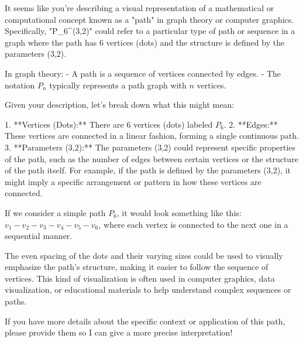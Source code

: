 It seems like you're describing a visual representation of a mathematical or computational concept known as a "path" in graph theory or computer graphics. Specifically, "P_6^(3,2)" could refer to a particular type of path or sequence in a graph where the path has 6 vertices (dots) and the structure is defined by the parameters (3,2).

In graph theory:
- A path is a sequence of vertices connected by edges.
- The notation \(P_n\) typically represents a path graph with \(n\) vertices.

Given your description, let's break down what this might mean:

1. **Vertices (Dots):** There are 6 vertices (dots) labeled \(P_6\).
2. **Edges:** These vertices are connected in a linear fashion, forming a single continuous path.
3. **Parameters (3,2):** The parameters (3,2) could represent specific properties of the path, such as the number of edges between certain vertices or the structure of the path itself. For example, if the path is defined by the parameters (3,2), it might imply a specific arrangement or pattern in how these vertices are connected.

If we consider a simple path \(P_6\), it would look something like this: \(v_1 - v_2 - v_3 - v_4 - v_5 - v_6\), where each vertex is connected to the next one in a sequential manner.

The even spacing of the dots and their varying sizes could be used to visually emphasize the path's structure, making it easier to follow the sequence of vertices. This kind of visualization is often used in computer graphics, data visualization, or educational materials to help understand complex sequences or paths.

If you have more details about the specific context or application of this path, please provide them so I can give a more precise interpretation!